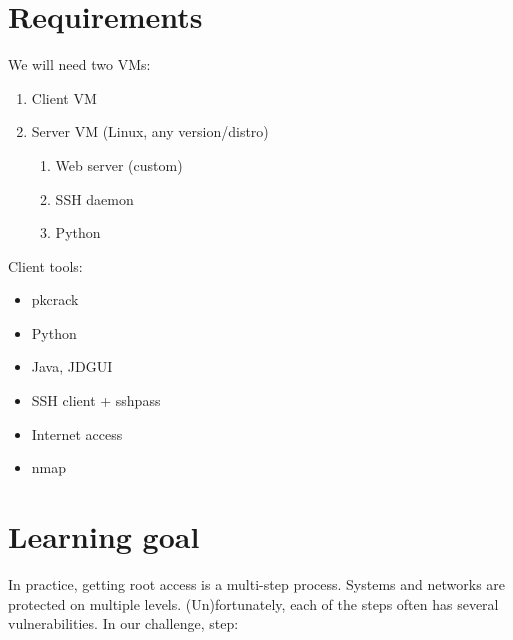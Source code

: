 \documentclass[a4paper]{article}
\begin{document}
\section{Requirements}

\noindent We will need two VMs:

\begin{enumerate}
  \item Client VM
  \item Server VM (Linux, any version/distro)
        \begin{enumerate}
          \item Web server (custom)
          \item SSH daemon
          \item Python
        \end{enumerate}
\end{enumerate}

\noindent Client tools:

\begin{itemize}
  \item pkcrack
  \item Python
  \item Java, JDGUI
  \item SSH client + sshpass
  \item Internet access
  \item nmap
\end{itemize}

\section{Learning goal}

In practice, getting root access is a multi-step process. Systems and
networks are protected on multiple levels. (Un)fortunately, each of the
steps often has several vulnerabilities. In our challenge, step:
\end{document}
